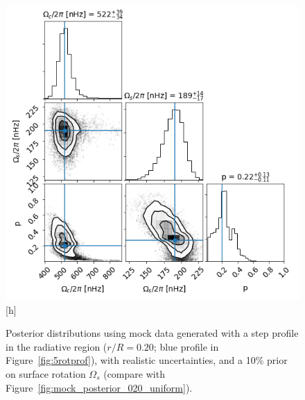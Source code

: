 \begin{figure}
\centering
    \includegraphics[width=\textwidth]{Figures/subgiant_chapter_figures/20.2_corner.png}[h]
    \caption{Posterior distributions using mock data generated with a step profile in the radiative region ($r/R = 0.20$; blue profile in Figure~\ref{fig:5rotprof}), with realistic uncertainties, and a 10\% prior on surface rotation $\Omega_s$ (compare with Figure~\ref{fig:mock_posterior_020_uniform}).}
    \label{fig:mock_posterior_020_reject}
\end{figure}

